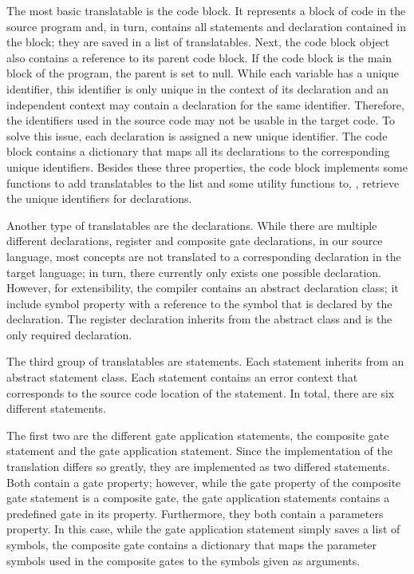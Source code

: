 The most basic translatable is the code block. It represents a block of code in the source program and, in turn, contains all statements and declaration contained in the block; they are saved in a list of translatables. Next, the code block object also contains a reference to its parent code block. If the code block is the main block of the program, the parent is set to null. While each variable has a unique identifier, this identifier is only unique in the context of its declaration and an independent context may contain a declaration for the same identifier. Therefore, the identifiers used in the source code may not be usable in the target code. To solve this issue, each declaration is assigned a new unique identifier. The code block contains a dictionary that maps all its declarations to the corresponding unique identifiers. Besides these three properties, the code block implements some functions to add translatables to the list and some utility functions to, \eg, retrieve the unique identifiers for declarations.

Another type of translatables are the declarations. While there are multiple different declarations, \eg register and composite gate declarations, in our source language, most concepts are not translated to a corresponding declaration in the target language; in turn, there currently only exists one possible declaration. However, for extensibility, the compiler contains an abstract declaration class; it include symbol property with a reference to the symbol that is declared by the declaration. The register declaration inherits from the abstract class and is the only required declaration. 

The third group of translatables are statements. Each statement inherits from an abstract statement class. Each statement contains an error context that corresponds to the source code location of the statement. In total, there are six different statements. 

The first two are the different gate application statements, the composite gate statement and the gate application statement. Since the implementation of the translation differs so greatly, they are implemented as two differed statements. Both contain a gate property; however, while the gate property of the composite gate statement is a composite gate, the gate application statements contains a predefined gate in its property. Furthermore, they both contain a parameters property. In this case, while the gate application statement simply saves a list of symbols, the composite gate contains a dictionary that maps the parameter symbols used in the composite gates to the symbols given as arguments.


